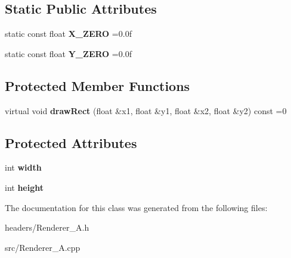 \subsection*{Static Public Attributes}
\begin{DoxyCompactItemize}
\item 
\hypertarget{class_renderer___a_aeab3b86fbef2f719f01fdbf0792d4848}{static const float {\bfseries X\-\_\-\-Z\-E\-R\-O} =0.\-0f}\label{class_renderer___a_aeab3b86fbef2f719f01fdbf0792d4848}

\item 
\hypertarget{class_renderer___a_ac2d79b93854681441cb48f96cb7e9f93}{static const float {\bfseries Y\-\_\-\-Z\-E\-R\-O} =0.\-0f}\label{class_renderer___a_ac2d79b93854681441cb48f96cb7e9f93}

\end{DoxyCompactItemize}
\subsection*{Protected Member Functions}
\begin{DoxyCompactItemize}
\item 
\hypertarget{class_renderer___a_aaaec84a39a7a49825b7513c12812740d}{virtual void {\bfseries draw\-Rect} (float \&x1, float \&y1, float \&x2, float \&y2) const =0}\label{class_renderer___a_aaaec84a39a7a49825b7513c12812740d}

\end{DoxyCompactItemize}
\subsection*{Protected Attributes}
\begin{DoxyCompactItemize}
\item 
\hypertarget{class_renderer___a_a0ca3fbb31eb776ee00b70536f267dfe7}{int {\bfseries width}}\label{class_renderer___a_a0ca3fbb31eb776ee00b70536f267dfe7}

\item 
\hypertarget{class_renderer___a_a36d0dfb8eeccad9e1ff0b0c461632f6a}{int {\bfseries height}}\label{class_renderer___a_a36d0dfb8eeccad9e1ff0b0c461632f6a}

\end{DoxyCompactItemize}


The documentation for this class was generated from the following files\-:\begin{DoxyCompactItemize}
\item 
headers/Renderer\-\_\-\-A.\-h\item 
src/Renderer\-\_\-\-A.\-cpp\end{DoxyCompactItemize}
